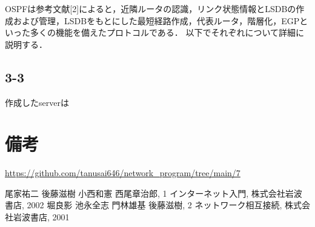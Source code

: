 \documentclass[documentclass]{jsarticle}
\begin{document}
OSPFは参考文献[2]によると，近隣ルータの認識，リンク状態情報とLSDBの作成および管理，LSDBをもとにした最短経路作成，代表ルータ，階層化，EGPといった多くの機能を備えたプロトコルである．
以下でそれぞれについて詳細に説明する．

\subsection*{3-3}
作成したserverは

\newpage
\section*{備考}
\url{https://github.com/tanusai646/network_program/tree/main/7}

\begin{thebibliography}{9}
   尾家祐二 後藤滋樹 小西和憲 西尾章治郎, 1 インターネット入門, 株式会社岩波書店, 2002 
   堀良影 池永全志 門林雄基 後藤滋樹, 2 ネットワーク相互接続, 株式会社岩波書店, 2001
\end{thebibliography}
\end{document}
